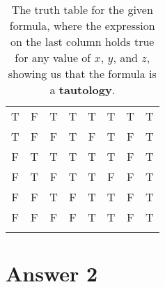 \documentclass[12pt]{article}
\begin{document}
\begin{enumerate}[label=\textbf{\alph*)}]
\begin{table}[H]
\begin{tabular}{||c|c|c|c|c|c|c|c||}
			\hhline{||-|-|-|-|-|-|-|-||}
			T & F & T & T & T & T & T & T\\
			\hhline{||-|-|-|-|-|-|-|-||}
			T & F & F & T & F & T & F & T\\
			\hhline{||-|-|-|-|-|-|-|-||}
			F & T & T & T & T & T & F & T\\
			\hhline{||-|-|-|-|-|-|-|-||}
			F & T & F & T & T & F & F & T\\
			\hhline{||-|-|-|-|-|-|-|-||}
			F & F & T & F & T & T & F & T\\
			\hhline{||-|-|-|-|-|-|-|-||}
			F & F & F & F & T & T & F & T\\
			\hhline{|b:=:=:=:=:=:=:=:=:b|}
			
		\end{tabular}
			\caption{The truth table for the given formula, where the expression on the last column holds true for any value of $x$, $y$, and $z$, showing us that the formula is a \textbf{tautology}.}
			
		\end{table}
	
\end{enumerate}



\section*{Answer 2}

%
\end{document}
